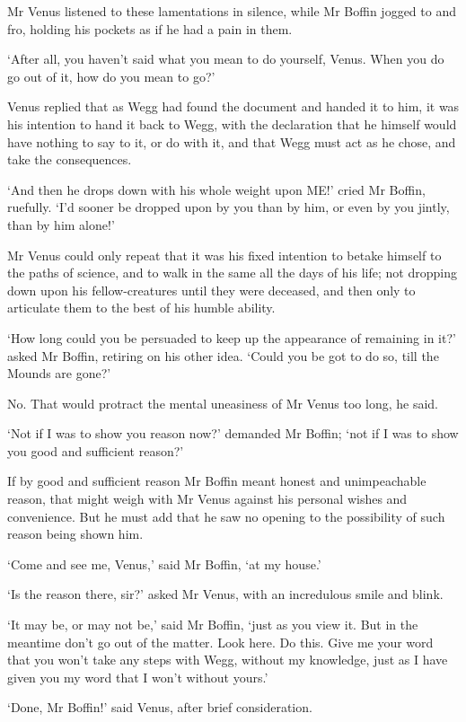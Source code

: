 Mr Venus listened to these lamentations in silence, while Mr Boffin
jogged to and fro, holding his pockets as if he had a pain in them.

‘After all, you haven’t said what you mean to do yourself, Venus. When
you do go out of it, how do you mean to go?’

Venus replied that as Wegg had found the document and handed it to him,
it was his intention to hand it back to Wegg, with the declaration that
he himself would have nothing to say to it, or do with it, and that Wegg
must act as he chose, and take the consequences.

‘And then he drops down with his whole weight upon ME!’ cried Mr Boffin,
ruefully. ‘I’d sooner be dropped upon by you than by him, or even by you
jintly, than by him alone!’

Mr Venus could only repeat that it was his fixed intention to betake
himself to the paths of science, and to walk in the same all the days
of his life; not dropping down upon his fellow-creatures until they were
deceased, and then only to articulate them to the best of his humble
ability.

‘How long could you be persuaded to keep up the appearance of remaining
in it?’ asked Mr Boffin, retiring on his other idea. ‘Could you be got
to do so, till the Mounds are gone?’

No. That would protract the mental uneasiness of Mr Venus too long, he
said.

‘Not if I was to show you reason now?’ demanded Mr Boffin; ‘not if I was
to show you good and sufficient reason?’

If by good and sufficient reason Mr Boffin meant honest and
unimpeachable reason, that might weigh with Mr Venus against his
personal wishes and convenience. But he must add that he saw no opening
to the possibility of such reason being shown him.

‘Come and see me, Venus,’ said Mr Boffin, ‘at my house.’

‘Is the reason there, sir?’ asked Mr Venus, with an incredulous smile
and blink.

‘It may be, or may not be,’ said Mr Boffin, ‘just as you view it. But
in the meantime don’t go out of the matter. Look here. Do this. Give me
your word that you won’t take any steps with Wegg, without my knowledge,
just as I have given you my word that I won’t without yours.’

‘Done, Mr Boffin!’ said Venus, after brief consideration.

